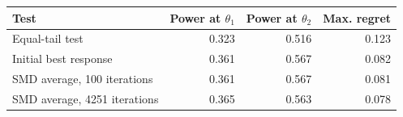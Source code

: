 \begin{tabular}{lrrr}
\toprule
Test & Power at $\theta_1$ & Power at $\theta_2$ & Max. regret \\
\midrule
Equal-tail test & 0.323 & 0.516 & 0.123 \\
Initial best response & 0.361 & 0.567 & 0.082 \\
SMD average, 100 iterations & 0.361 & 0.567 & 0.081 \\
SMD average, 4251 iterations & 0.365 & 0.563 & 0.078 \\
\bottomrule
\end{tabular}
